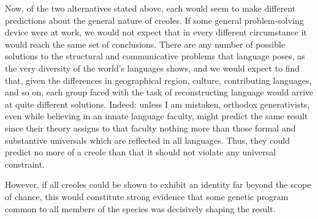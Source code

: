 
Now, of the two alternatives stated above, each would seem to make different predictions about the general nature of creoles. If some general problem-solving device were at work, we would not expect that in every different circumstance it would reach the same set of conclusions. There are any number of possible solutions to the struc\-tural and communicative problems that language poses, as the very diversity of the world's languages shows, and we would expect to find that, given the differences in geographical region, culture, contributing languages, and so on, each group faced with the task of reconstructing language would arrive at quite different solutions. Indeed: unless I am mistaken, orthodox generativists, even while believing in an innate language faculty, might predict the same result since their theory assigns to that faculty nothing more than those formal and substantive universals which are reflected in all languages. Thus, they could pre\-dict no more of a creole than that it should not violate any universal constraint.

However, if all creoles could be shown to exhibit an identity far beyond the scope of chance, this would constitute strong evidence that some genetic program common to all members of the species was decisively shaping the result.

